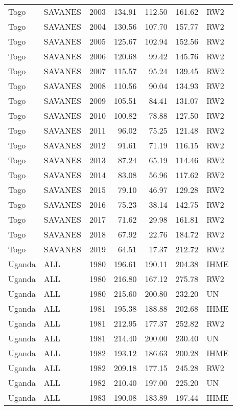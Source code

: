 \begin{longtable}{lllrrrl}
  Togo & SAVANES & 2003 & 134.91 & 112.50 & 161.62 & RW2 \\ 
  Togo & SAVANES & 2004 & 130.56 & 107.70 & 157.77 & RW2 \\ 
  Togo & SAVANES & 2005 & 125.67 & 102.94 & 152.56 & RW2 \\ 
  Togo & SAVANES & 2006 & 120.68 & 99.42 & 145.76 & RW2 \\ 
  Togo & SAVANES & 2007 & 115.57 & 95.24 & 139.45 & RW2 \\ 
  Togo & SAVANES & 2008 & 110.56 & 90.04 & 134.93 & RW2 \\ 
  Togo & SAVANES & 2009 & 105.51 & 84.41 & 131.07 & RW2 \\ 
  Togo & SAVANES & 2010 & 100.82 & 78.88 & 127.50 & RW2 \\ 
  Togo & SAVANES & 2011 & 96.02 & 75.25 & 121.48 & RW2 \\ 
  Togo & SAVANES & 2012 & 91.61 & 71.19 & 116.15 & RW2 \\ 
  Togo & SAVANES & 2013 & 87.24 & 65.19 & 114.46 & RW2 \\ 
  Togo & SAVANES & 2014 & 83.08 & 56.96 & 117.62 & RW2 \\ 
  Togo & SAVANES & 2015 & 79.10 & 46.97 & 129.28 & RW2 \\ 
  Togo & SAVANES & 2016 & 75.23 & 38.14 & 142.75 & RW2 \\ 
  Togo & SAVANES & 2017 & 71.62 & 29.98 & 161.81 & RW2 \\ 
  Togo & SAVANES & 2018 & 67.92 & 22.76 & 184.72 & RW2 \\ 
  Togo & SAVANES & 2019 & 64.51 & 17.37 & 212.72 & RW2 \\ 
  Uganda & ALL & 1980 & 196.61 & 190.11 & 204.38 & IHME \\ 
  Uganda & ALL & 1980 & 216.80 & 167.12 & 275.78 & RW2 \\ 
  Uganda & ALL & 1980 & 215.60 & 200.80 & 232.20 & UN \\ 
  Uganda & ALL & 1981 & 195.38 & 188.88 & 202.68 & IHME \\ 
  Uganda & ALL & 1981 & 212.95 & 177.37 & 252.82 & RW2 \\ 
  Uganda & ALL & 1981 & 214.40 & 200.00 & 230.40 & UN \\ 
  Uganda & ALL & 1982 & 193.12 & 186.63 & 200.28 & IHME \\ 
  Uganda & ALL & 1982 & 209.18 & 177.15 & 245.28 & RW2 \\ 
  Uganda & ALL & 1982 & 210.40 & 197.00 & 225.20 & UN \\ 
  Uganda & ALL & 1983 & 190.08 & 183.89 & 197.44 & IHME \\ 

\end{longtable}
